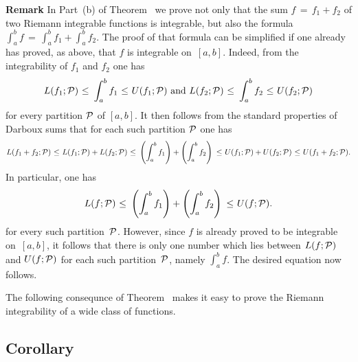 \V

        {\bf Remark} In Part~(b) of Theorem~ we prove not only that the sum $f \,=\, f_{1} + f_{2}$ of two Riemann integrable functions is integrable,
    but also the formula ${\displaystyle \int_{a}^{b} f \,=\, \int_{a}^{b} f_{1} + \int_{a}^{b} f_{2}}$. The proof of that formula can be simplified if one already has proved,
    as above, that $f$ is integrable on~$[a,b]$. Indeed, from the integrability of $f_{1}$ and $f_{2}$ one has
        \begin{displaymath}
        L(f_{1};{\cal P})\,\,{\leq}\,\,\int_{a}^{b} f_{1}\,\,{\leq}\,\,U(f_{1};{\cal P})
    \mbox{ and }
        L(f_{2};{\cal P})\,\,{\leq}\,\,\int_{a}^{b} f_{2}\,\,{\leq}\,\,U(f_{2};{\cal P})
        \end{displaymath}
    for every partition ${\cal P}$ of $[a,b]$. It then follows from the standard properties of Darboux sums that for each such partition ${\cal P}$ one has
        \begin{displaymath}
        L(f_{1}+f_{2};{\cal P})
    \,\,{\leq}\,\,
        L(f_{1}; {\cal P}) + L(f_{2};{\cal P})
    \,\,{\leq}\,\,
        \left(\int_{a}^{b} f_{1}\right) + \left(\int_{a}^{b} f_{2}\right)
    \,\,{\leq}\,\,
        U(f_{1};{\cal P}) + U(f_{2}; {\cal P})
    \,\,{\leq}\,\,
        U(f_{1}+ f_{2};{\cal P}).
        \end{displaymath}
    In particular, one has
        \begin{displaymath}
        L(f;{\cal P})
    \,\,{\leq}\,\,
        \left(\int_{a}^{b} f_{1}\right) + \left(\int_{a}^{b} f_{2}\right)
    \,\,{\leq}\,\,
        U(f;{\cal P}).
        \end{displaymath}
    for every such partition~${\cal P}$.
   However, since $f$ is already proved to be integrable on~$[a,b]$, it follows that there is only one number which lies between $L(f;{\cal P})$ and $U(f;{\cal P})$
    for each such partition~${\cal P}$, namely ${\displaystyle \int_{a}^{b} f}$. The desired equation now follows.

\VV

        The following consequnce of Theorem~ makes it easy to prove the Riemann integrability of a wide class of functions.

\V

        \subsection{\small{{\bf Corollary}}}
        \label{CorH20.75C}

